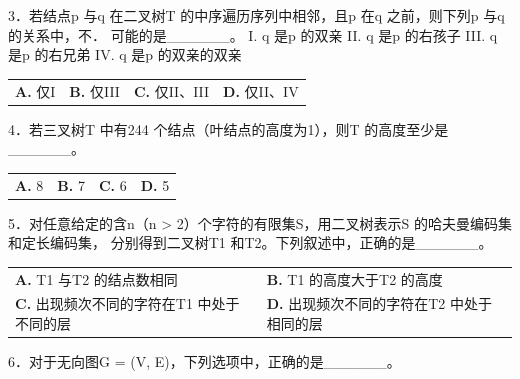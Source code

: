 \documentclass[UTF8,11pt]{ctexart}
\begin{document}
3．若结点p 与q 在二叉树T 的中序遍历序列中相邻，且p 在q 之前，则下列p 与q 的关系中，不． 可能的是\_\_\_\_\_\_。 I. q 是p 的双亲 II. q 是p 的右孩子 III. q 是p 的右兄弟 IV. q 是p 的双亲的双亲


\begin{center}\begin{tabular}{>{\raggedright\arraybackslash}p{\dimexpr(\linewidth-8\tabcolsep)/4\relax}>{\raggedright\arraybackslash}p{\dimexpr(\linewidth-8\tabcolsep)/4\relax}>{\raggedright\arraybackslash}p{\dimexpr(\linewidth-8\tabcolsep)/4\relax}>{\raggedright\arraybackslash}p{\dimexpr(\linewidth-8\tabcolsep)/4\relax}}
\textbf{A.} 仅I & \textbf{B.} 仅III & \textbf{C.} 仅II、III & \textbf{D.} 仅II、IV\\[.35em]\end{tabular}\end{center}

4．若三叉树T 中有244 个结点（叶结点的高度为1），则T 的高度至少是\_\_\_\_\_\_。


\begin{center}\begin{tabular}{>{\raggedright\arraybackslash}p{\dimexpr(\linewidth-8\tabcolsep)/4\relax}>{\raggedright\arraybackslash}p{\dimexpr(\linewidth-8\tabcolsep)/4\relax}>{\raggedright\arraybackslash}p{\dimexpr(\linewidth-8\tabcolsep)/4\relax}>{\raggedright\arraybackslash}p{\dimexpr(\linewidth-8\tabcolsep)/4\relax}}
\textbf{A.} 8 & \textbf{B.} 7 & \textbf{C.} 6 & \textbf{D.} 5\\[.35em]\end{tabular}\end{center}

5．对任意给定的含n（n > 2）个字符的有限集S，用二叉树表示S 的哈夫曼编码集和定长编码集， 分别得到二叉树T1 和T2。下列叙述中，正确的是\_\_\_\_\_\_。


\begin{center}\begin{tabular}{>{\raggedright\arraybackslash}p{\dimexpr(\linewidth-4\tabcolsep)/2\relax}>{\raggedright\arraybackslash}p{\dimexpr(\linewidth-4\tabcolsep)/2\relax}}
\textbf{A.} T1 与T2 的结点数相同 & \textbf{B.} T1 的高度大于T2 的高度\\[.35em]
\textbf{C.} 出现频次不同的字符在T1 中处于不同的层 & \textbf{D.} 出现频次不同的字符在T2 中处于相同的层\\[.35em]\end{tabular}\end{center}

6．对于无向图G = (V, E)，下列选项中，正确的是\_\_\_\_\_\_。
\end{document}
